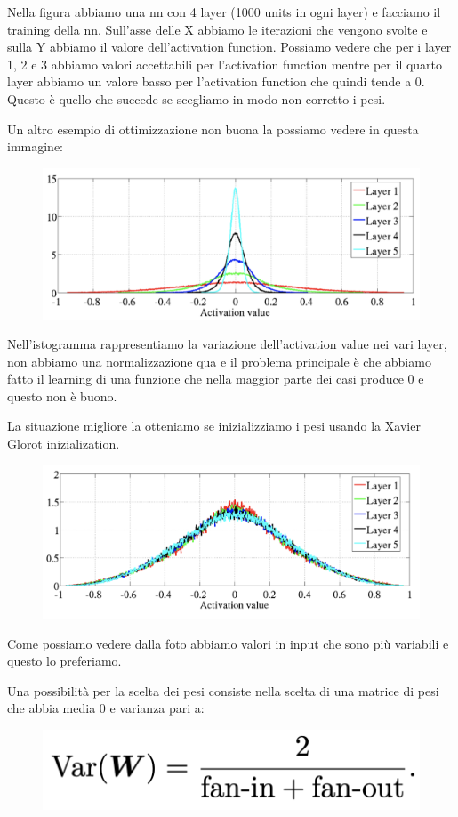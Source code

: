 \documentclass[14pt]{extreport}
\begin{document}
Nella figura abbiamo una nn con 4 layer (1000 units in ogni layer) e facciamo il training della nn.
Sull'asse delle X abbiamo le iterazioni che vengono svolte e sulla Y abbiamo il valore dell'activation function.
Possiamo vedere che per i layer 1, 2 e 3 abbiamo valori accettabili per l'activation function mentre per il quarto layer
abbiamo un valore basso per l'activation function che quindi tende a 0.
Questo è quello che succede se scegliamo in modo non corretto i pesi.

Un altro esempio di ottimizzazione non buona la possiamo vedere in questa immagine:
\begin{figure}[H]
	\centering
	\includegraphics[width=0.7\linewidth]{424.jpeg}
	\end{figure}

Nell'istogramma rappresentiamo la variazione dell'activation value nei vari layer, non abbiamo una normalizzazione qua e il problema principale è che 
abbiamo fatto il learning di una funzione che nella maggior parte dei casi produce 0 e questo non è buono.

La situazione migliore la otteniamo se inizializziamo i pesi usando la Xavier Glorot inizialization.
\begin{figure}[H]
	\centering
	\includegraphics[width=0.7\linewidth]{425.jpeg}
	\end{figure}
Come possiamo vedere dalla foto abbiamo valori in input che sono più variabili e questo lo preferiamo.

Una possibilità per la scelta dei pesi consiste nella scelta di una matrice di pesi che abbia 
media 0 e varianza pari a:

\begin{figure}[H]
	\centering
	\includegraphics[width=0.7\linewidth]{427.jpeg}
	\end{figure}
\end{document}
